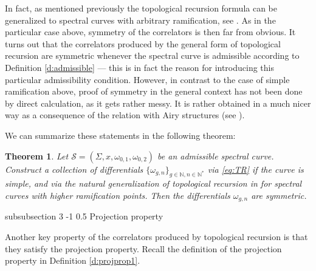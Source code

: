 \documentclass[reqno,oneside,11pt]{amsart}
\makeatletter
\theoremstyle{plain}
\newtheorem{theorem}{Theorem}[section]
\theoremstyle{definition}
\newtheorem{definition}[theorem]{Definition}
\theoremstyle{remark}
\numberwithin{equation}{section}
\renewcommand{\subsubsection}{\@startsection
{subsubsection}%
{3}%
{\z@}%
{-1\baselineskip}%
{0.5\baselineskip}%
{\normalfont \it \normalsize}} %
\DeclareMathOperator*{\Res}{Res}
\newcommand{\Ra}{\text{Ram}}
\makeatother
\begin{document}
In fact, as mentioned previously the topological recursion formula can be generalized to spectral curves with arbitrary ramification, see \cite{BE13}. As in the particular case above, symmetry of the correlators is then far from obvious. It turns out that the correlators produced by the general form of topological recursion are symmetric whenever the spectral curve is admissible according to Definition \ref{d:admissible} --- this is in fact the reason for introducing this particular admissibility condition. However, in contrast to the case of simple ramification above, proof of symmetry in the general context has not been done by direct calculation, as it gets rather messy. It is rather obtained  in a much nicer way as a consequence of the relation with Airy structures (see \cite{BBCCN18}).

We can summarize these statements in the following theorem:

\begin{theorem}
Let $\mathcal{S} = (\Sigma,x,\omega_{0,1}, \omega_{0,2})$ be an admissible spectral curve. Construct a collection of differentials $\{\omega_{g,n} \}_{g \in \mathbb{N}, n \in \mathbb{N}^* }$ via \eqref{eq:TR} if the curve is simple, and via the natural generalization of topological recursion in \cite{BE13} for spectral curves with higher ramification points. Then the differentials $\omega_{g,n}$ are symmetric.
\end{theorem}

\subsubsection{Projection property}

Another key property of the correlators produced by topological recursion is that they satisfy the projection property. Recall the definition of the projection property in Definition \ref{d:projprop1}.
%
\end{document}
